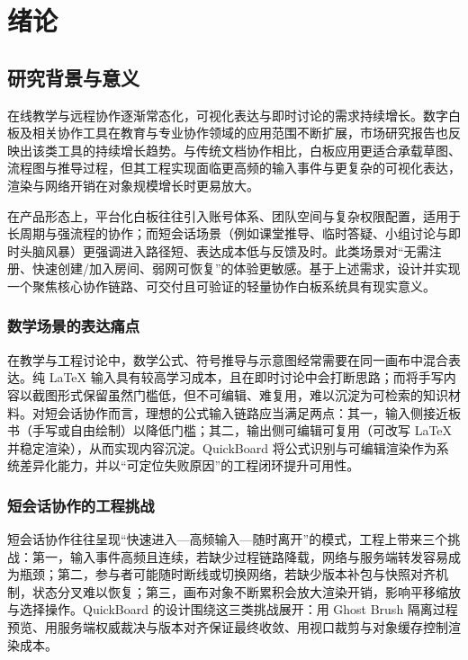 \chapter{绪论}\label{chap:introduction}

\section{研究背景与意义}
在线教学与远程协作逐渐常态化，可视化表达与即时讨论的需求持续增长。数字白板及相关协作工具在教育与专业协作领域的应用范围不断扩展，市场研究报告也反映出该类工具的持续增长趋势\cite{market_vmr_2024,market_htf_2025}。与传统文档协作相比，白板应用更适合承载草图、流程图与推导过程，但其工程实现面临更高频的输入事件与更复杂的可视化表达，渲染与网络开销在对象规模增长时更易放大。

在产品形态上，平台化白板往往引入账号体系、团队空间与复杂权限配置，适用于长周期与强流程的协作；而短会话场景（例如课堂推导、临时答疑、小组讨论与即时头脑风暴）更强调进入路径短、表达成本低与反馈及时。此类场景对“无需注册、快速创建/加入房间、弱网可恢复”的体验更敏感。基于上述需求，设计并实现一个聚焦核心协作链路、可交付且可验证的轻量协作白板系统具有现实意义。

\subsection{数学场景的表达痛点}
在教学与工程讨论中，数学公式、符号推导与示意图经常需要在同一画布中混合表达。纯 LaTeX 输入具有较高学习成本，且在即时讨论中会打断思路；而将手写内容以截图形式保留虽然门槛低，但不可编辑、难复用，难以沉淀为可检索的知识材料。对短会话协作而言，理想的公式输入链路应当满足两点：其一，输入侧接近板书（手写或自由绘制）以降低门槛；其二，输出侧可编辑可复用（可改写 LaTeX 并稳定渲染），从而实现内容沉淀。QuickBoard 将公式识别与可编辑渲染作为系统差异化能力，并以“可定位失败原因”的工程闭环提升可用性。

\subsection{短会话协作的工程挑战}
短会话协作往往呈现“快速进入—高频输入—随时离开”的模式，工程上带来三个挑战：第一，输入事件高频且连续，若缺少过程链路降载，网络与服务端转发容易成为瓶颈；第二，参与者可能随时断线或切换网络，若缺少版本补包与快照对齐机制，状态分叉难以恢复；第三，画布对象不断累积会放大渲染开销，影响平移缩放与选择操作。QuickBoard 的设计围绕这三类挑战展开：用 Ghost Brush 隔离过程预览、用服务端权威裁决与版本对齐保证最终收敛、用视口裁剪与对象缓存控制渲染成本。

